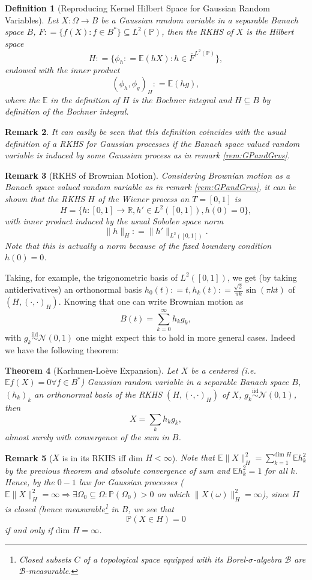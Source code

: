 \documentclass[11pt,reqno]{amsart}
\numberwithin{equation}{section}
\newtheorem{thm}{Theorem}[section]
\newtheorem{defi}[thm]{Definition}
\newtheorem{rem}[thm]{Remark}
\newcommand{\deq}{\mathrel{\mathop:}=}
\newcommand{\iidnormal}{\mathrel{\stackrel{\text{iid}}{\sim}}\mathcal N(0,1)}
\begin{document}
\begin{defi}[Reproducing Kernel Hilbert Space for Gaussian Random Variables]
	Let $X:\Omega\rightarrow B$ be a Gaussian random variable in a separable Banach space $B$, $F\deq\{f(X):f\in B^*\}\subseteq L^2(\mathbb P)$, then the RKHS of $X$ is the Hilbert space $$H\deq\{\phi_h\deq\mathbb E(hX): h\in\overline F^{L^2(\mathbb P)}\},$$
	endowed with the inner product
	$$(\phi_h,\phi_g)_H\deq\mathbb E(hg),$$
	where the $\mathbb E$ in the definition of $H$ is the Bochner integral and $H\subseteq B$ by definition of the Bochner integral.
\end{defi}
\begin{rem}
	It can easily be seen that this definition coincides with the usual definition of a RKHS for Gaussian processes if the Banach space valued random variable is induced by some Gaussian process as in remark \ref{rem:GPandGrvs}.
\end{rem}

\begin{rem}[RKHS of Brownian Motion]\label{rem:RKHSofBM}
	Considering Brownian motion as a Banach space valued random variable as in remark \ref{rem:GPandGrvs}, it can be shown that the RKHS $H$ of the Wiener process on $T=[0,1]$ is $$H = \{h:[0,1]\rightarrow\mathbb R, h'\in L^2([0,1]), h(0)=0\},$$ with inner product induced by the usual Sobolev space norm $$\|h\|_H\deq \|h'\|_{L^2([0,1])}.$$
	Note that this is actually a norm because of the fixed boundary condition $h(0)=0$.
\end{rem}

Taking, for example, the trigonometric basis of $L^2([0,1])$, we get (by taking antiderivatives) an orthonormal basis $h_0(t)\deq t, h_k(t)\deq \frac{\sqrt 2}{\pi k}\sin(\pi kt)$ of $(H,(\cdot,\cdot)_H)$. Knowing that one can write Brownian motion as $$B(t)=\sum_{k=0}^\infty h_kg_k,$$ with $g_k\iidnormal$ one might expect this to hold in more general cases.
Indeed we have the following theorem:

\begin{thm}[Karhunen-Lo\`eve Expansion]
	Let $X$ be a centered (i.e. $\mathbb E f(X)=0 \forall f\in B^*$) Gaussian random variable in a separable Banach space $B$, $(h_k)_k$ an orthonormal basis of the RKHS $(H,(\cdot,\cdot)_H)$ of $X$, $g_k\iidnormal$, then
	$$X=\sum_k h_kg_k,$$
	almost surely with convergence of the sum in $B$.
\end{thm}

\begin{rem}[$X$ is in its RKHS iff dim $H<\infty$]\label{rem:XnotinRKHS}
	Note that $\mathbb E\|X\|_H^2 = \sum_{k=1}^{\text{dim }H}\mathbb E h_k^2$ by the previous theorem and absolute convergence of sum and $\mathbb E h_k^2 = 1$ for all $k$. Hence, by the $0-1$ law for Gaussian processes ($\mathbb E\|X\|_H^2=\infty \Rightarrow \exists\Omega_0\subseteq\Omega: \mathbb P(\Omega_0)>0$ on which $\|X(\omega)\|_H^2=\infty$), since $H$ is closed (hence measurable\footnote{Closed subsets $C$ of a topological space equipped with its Borel-$\sigma$-algebra $\mathcal B$ are $\mathcal B$-measurable.} in $B$, we see that $$\mathbb P(X\in H)=0$$
	if and only if $\text{dim }H=\infty$.
\end{rem}
\end{document}
